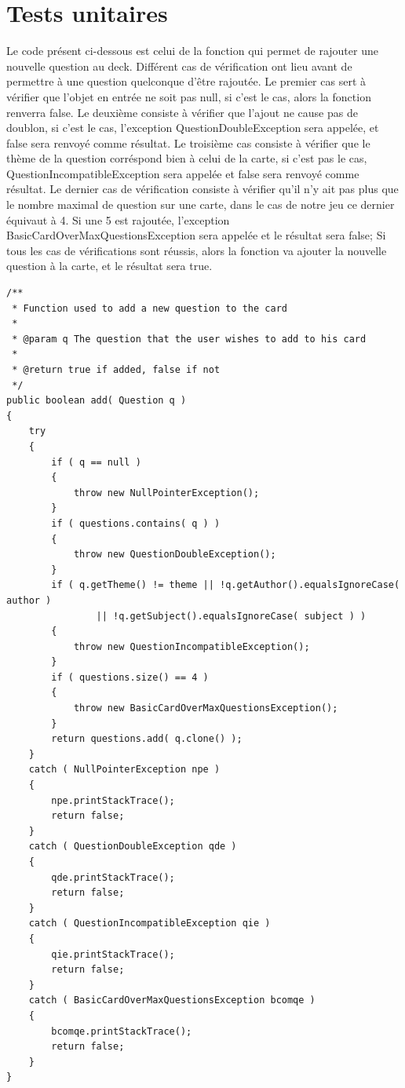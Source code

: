 \newpage
\section{Tests unitaires}

Le code présent ci-dessous est celui de la fonction qui permet de rajouter une nouvelle question au deck.
Différent cas de vérification ont lieu avant de permettre à une question quelconque d'être rajoutée.
Le premier cas sert à vérifier que l'objet en entrée ne soit pas null, si c'est le cas, alors la fonction renverra false.
Le deuxième consiste à vérifier que l'ajout ne cause pas de doublon, si c'est le cas, l'exception QuestionDoubleException sera appelée, et false sera renvoyé comme résultat.
Le troisième cas consiste à vérifier que le thème de la question corréspond bien à celui de la carte, si c'est pas le cas, QuestionIncompatibleException sera appelée et false sera renvoyé comme résultat.
Le dernier cas de vérification consiste à vérifier qu'il n'y ait pas plus que le nombre maximal de question sur une carte, dans le cas de notre jeu ce dernier équivaut à 4.
Si une 5 est rajoutée, l'exception BasicCardOverMaxQuestionsException sera appelée et le résultat sera false;
Si tous les cas de vérifications sont réussis, alors la fonction va ajouter la nouvelle question à la carte, et le résultat sera true.

\begin{lstlisting}
/**
 * Function used to add a new question to the card
 * 
 * @param q The question that the user wishes to add to his card
 * 
 * @return true if added, false if not
 */
public boolean add( Question q )
{
    try
    {
        if ( q == null )
        {
            throw new NullPointerException();
        }
        if ( questions.contains( q ) )
        {
            throw new QuestionDoubleException();
        }
        if ( q.getTheme() != theme || !q.getAuthor().equalsIgnoreCase( author )
                || !q.getSubject().equalsIgnoreCase( subject ) )
        {
            throw new QuestionIncompatibleException();
        }
        if ( questions.size() == 4 )
        {
            throw new BasicCardOverMaxQuestionsException();
        }
        return questions.add( q.clone() );
    }
    catch ( NullPointerException npe )
    {
        npe.printStackTrace();
        return false;
    }
    catch ( QuestionDoubleException qde )
    {
        qde.printStackTrace();
        return false;
    }
    catch ( QuestionIncompatibleException qie )
    {
        qie.printStackTrace();
        return false;
    }
    catch ( BasicCardOverMaxQuestionsException bcomqe )
    {
        bcomqe.printStackTrace();
        return false;
    }
}
\end{lstlisting}

